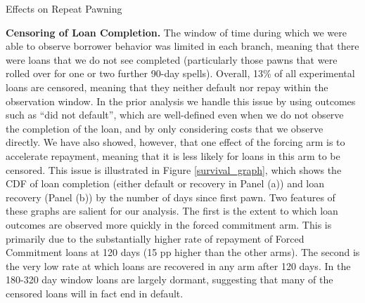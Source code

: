 \documentclass[ecta,nameyear,final]{econsocart}
\begin{document}
\begin{table}
\caption{Effects on Repeat Pawning}
\label{repeat_loans}
\begin{center}
\scriptsize{}
\end{center}
\end{table}


\noindent \textbf{Censoring of Loan Completion.}
The window of time during which we were able to observe borrower behavior was limited in each branch, meaning that there were loans that we do not see completed (particularly those pawns that were rolled over for one or two further 90-day spells).  Overall, 13\% of all experimental loans are censored, meaning that they neither default nor repay within the observation window.  In the prior analysis we handle this issue by using outcomes such as ``did not default'', which are well-defined even when we do not observe the completion of the loan, and by only considering costs that we observe directly.  We have also showed, however, that one effect of the forcing arm is to accelerate repayment, meaning that it is less likely for loans in this arm to be censored.  This issue is illustrated in Figure \ref{survival_graph}, which shows the CDF of loan completion (either default or recovery in Panel (a)) and loan recovery (Panel (b)) by the number of days since first pawn.  Two features of these graphs are salient for our analysis.  The first is the extent to which loan outcomes are observed more quickly in the forced commitment arm.  This is primarily due to the substantially higher rate of repayment of Forced Commitment loans at 120 days (15 pp higher than the other arms).  The second is the very low rate at which loans are recovered in any arm after 120 days.  In the 180-320 day window loans are largely dormant, suggesting that many of the censored loans will in fact end in default.
\end{document}
